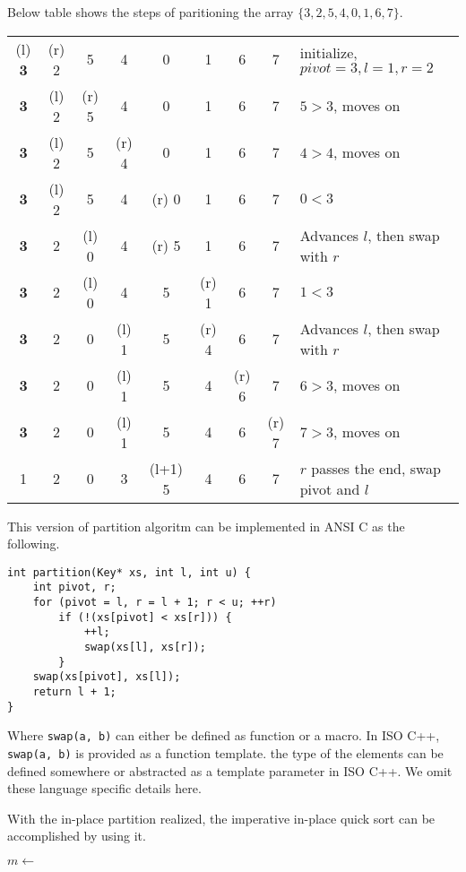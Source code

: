 \documentclass{article}
\begin{document}
Below table shows the steps of paritioning the array $\{ 3, 2, 5, 4, 0, 1, 6, 7\}$.

\begin{tabular}{ | c c c c c c c c | l |}
\hline
(l) {\bf 3} & (r) 2 & 5 & 4 & 0 & 1 & 6 & 7 & initialize, $pivot = 3, l = 1, r = 2$ \\
{\bf 3} & (l) 2 & (r) 5 & 4 & 0 & 1 & 6 & 7 & $5 > 3$, moves on \\
{\bf 3} & (l) 2 & 5 & (r) 4 & 0 & 1 & 6 & 7 & $4 > 4$, moves on \\
{\bf 3} & (l) 2 & 5 & 4 & (r) 0 & 1 & 6 & 7 & $0 < 3$ \\
{\bf 3} & 2 & (l) 0 & 4 & (r) 5 & 1 & 6 & 7 & Advances $l$, then swap with $r$ \\
{\bf 3} & 2 & (l) 0 & 4 & 5 & (r) 1 & 6 & 7 & $1 < 3$ \\
{\bf 3} & 2 & 0 & (l) 1 & 5 & (r) 4 & 6 & 7 & Advances $l$, then swap with $r$ \\
{\bf 3} & 2 & 0 & (l) 1 & 5 & 4 & (r) 6 & 7 & $6 > 3$, moves on \\
{\bf 3} & 2 & 0 & (l) 1 & 5 & 4 & 6 & (r) 7 & $7 > 3$, moves on \\
1 & 2 & 0 & 3 & (l+1) 5 & 4 & 6 & 7 & $r$ passes the end, swap pivot and $l$ \\
\hline
\end{tabular}

This version of partition algoritm can be implemented in ANSI C as the following.
\lstset{language=C}
\begin{lstlisting}
int partition(Key* xs, int l, int u) {
    int pivot, r;
    for (pivot = l, r = l + 1; r < u; ++r)
        if (!(xs[pivot] < xs[r])) {
            ++l;
            swap(xs[l], xs[r]);
        }
    swap(xs[pivot], xs[l]);
    return l + 1;
}  
\end{lstlisting}

Where \verb|swap(a, b)| can either be defined as function or a macro. In ISO C++, \verb|swap(a, b)|
is provided as a function template. the type of the elements can be defined somewhere or abstracted
as a template parameter in ISO C++. We omit these language specific details here.

With the in-place partition realized, the imperative in-place quick sort can be accomplished by using it.

\begin{algorithmic}[1]
    \State $m \gets$ 
    \State {}
    \State {}
  \EndIf
\EndProcedure
\end{algorithmic}
\end{document}
